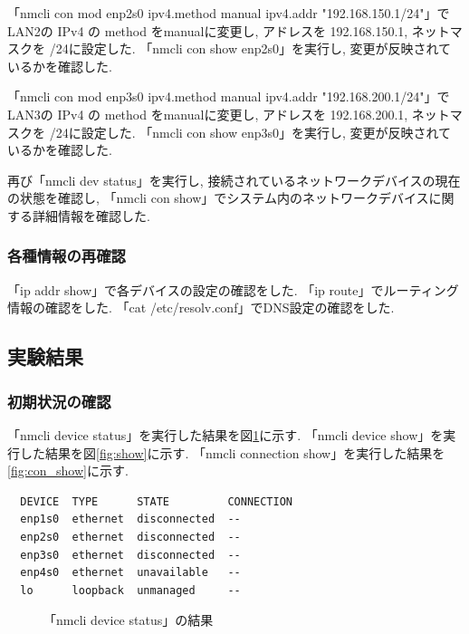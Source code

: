 \documentclass{ltjsarticle} %
\begin{document}
「nmcli con mod enp2s0 ipv4.method manual ipv4.addr "192.168.150.1/24"」でLAN2の
IPv4 の method をmanualに変更し, アドレスを 192.168.150.1, ネットマスクを /24に設定した. 
「nmcli con show enp2s0」を実行し, 変更が反映されているかを確認した.

「nmcli con mod enp3s0 ipv4.method manual ipv4.addr "192.168.200.1/24"」でLAN3の
IPv4 の method をmanualに変更し, アドレスを 192.168.200.1, ネットマスクを /24に設定した. 
「nmcli con show enp3s0」を実行し, 変更が反映されているかを確認した. 

再び「nmcli dev status」を実行し, 接続されているネットワークデバイスの現在の状態を確認し, 
「nmcli con show」でシステム内のネットワークデバイスに関する詳細情報を確認した. 

\subsubsection{各種情報の再確認}
「ip addr show」で各デバイスの設定の確認をした. 
「ip route」でルーティング情報の確認をした. 
「cat /etc/resolv.conf」でDNS設定の確認をした. 

\subsection{実験結果}

\subsubsection{初期状況の確認}
「nmcli device status」を実行した結果を図\ref{fig:status}に示す. 
「nmcli device show」を実行した結果を図\ref{fig:show}に示す. 
「nmcli connection show」を実行した結果を\ref{fig:con_show}に示す. 

\begin{mdframed}
  \begin{verbatim}
  DEVICE  TYPE      STATE         CONNECTION
  enp1s0  ethernet  disconnected  --
  enp2s0  ethernet  disconnected  --
  enp3s0  ethernet  disconnected  --
  enp4s0  ethernet  unavailable   --
  lo      loopback  unmanaged     --
  \end{verbatim}
  \end{mdframed}
  \begin{figure}[H]
  \caption{「nmcli device status」の結果}
  \label{fig:status}
\end{figure}
\end{document}
